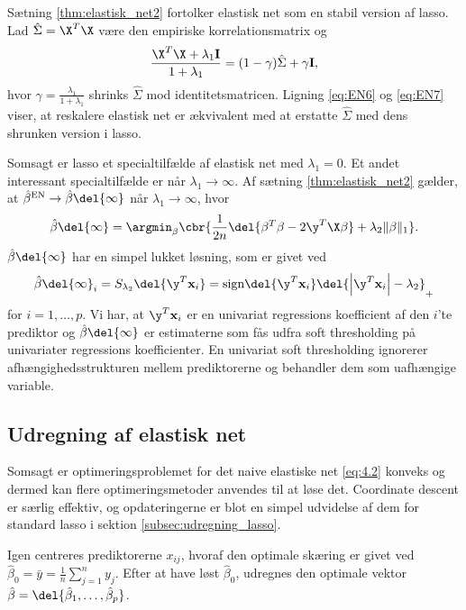 %
Sætning \ref{thm:elastisk_net2} fortolker elastisk net som en stabil version af lasso.
Lad \(\hat{\Sigma} = \X^T \X\) være den empiriske korrelationsmatrix og
\begin{align*}
\frac{\X^T \X + \lambda_1 \mathbf{I}}{1 + \lambda_1} = (1-\gamma) \hat{\Sigma} + \gamma \mathbf{I},
\end{align*}
hvor \(\gamma=\frac{\lambda_1}{1+\lambda_1}\) shrinks \(\hat{\Sigma}\) mod identitetsmatricen.
Ligning \eqref{eq:EN6} og \eqref{eq:EN7} viser, at reskalere elastisk net er ækvivalent med at erstatte \(\hat{\Sigma}\) med dens shrunken version i lasso.


Somsagt er lasso et specialtilfælde af elastisk net med \(\lambda_1=0\). 
Et andet interessant specialtilfælde er når \(\lambda_1 \rightarrow \infty\).
Af sætning \ref{thm:elastisk_net2} gælder, at \(\hat{\beta}^\text{EN} \rightarrow \hat{\beta} \del{\infty}\) når \(\lambda_1 \rightarrow \infty\), hvor
\begin{align*}
\hat{\beta} \del{\infty} = \argmin_\beta \cbr{\frac{1}{2n} \del{\beta^T \beta - 2 \y^T \X \beta} + \lambda_2 \Vert \beta \Vert_1}.
\end{align*}
\(\hat{\beta} \del{\infty}\) har en simpel lukket løsning, som er givet ved
\begin{align*}
\hat{\beta} \del{\infty}_i = S_{\lambda_2} \del{\y^T \mathbf{x}_i}=\text{sign} \del{\y^T \mathbf{x}_i} \del{\left\vert \y^T \mathbf{x}_i \right\vert - \lambda_2}_+
\end{align*}
for \(i = 1, \ldots, p\).
Vi har, at \(\y^T \mathbf{x}_i\) er en univariat regressions koefficient af den \(i\)'te prediktor og \(\hat{\beta} \del{\infty}\) er estimaterne som fås udfra soft thresholding på univariater regressions koefficienter.
En univariat soft thresholding ignorerer afhængighedsstrukturen mellem prediktorerne og behandler dem som uafhængige variable.

\subsection{Udregning af elastisk net}
Somsagt er optimeringsproblemet for det naive elastiske net \eqref{eq:4.2} konveks og dermed kan flere optimeringsmetoder anvendes til at løse det.
Coordinate descent er særlig effektiv, og opdateringerne er blot en simpel udvidelse af dem for standard lasso i sektion \ref{subsec:udregning_lasso}.

Igen centreres prediktorerne \(x_{ij}\), hvoraf den optimale skæring er givet ved \(\hat{\beta}_0=\bar{y}=\frac{1}{n} \sum_{j=1}^n y_j\).
Efter at have løst \(\hat{\beta}_0\), udregnes den optimale vektor \(\hat{\beta}= \del{\hat{\beta}_1, \ldots, \hat{\beta}_p}\).

